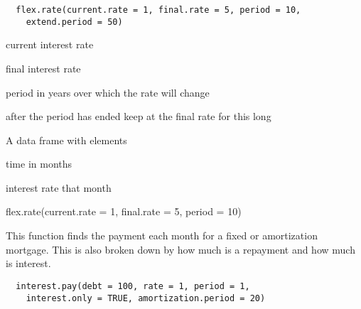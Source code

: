 \documentclass[a4paper]{book}
\begin{document}
%
\begin{Usage}
\begin{verbatim}
  flex.rate(current.rate = 1, final.rate = 5, period = 10,
    extend.period = 50)
\end{verbatim}
\end{Usage}
%
\begin{Arguments}
\begin{ldescription}
\item[\code{current.rate}] current interest rate

\item[\code{final.rate}] final interest rate

\item[\code{period}] period in years over which the rate will
change

\item[\code{extend.period}] after the period has ended keep at
the final rate for this long
\end{ldescription}
\end{Arguments}
%
\begin{Value}
A data frame with elements \begin{ldescription}
\item[\code{month}] time in months
\item[\code{rate}] interest rate that month
\end{ldescription}
\end{Value}
%
\begin{Examples}
\begin{ExampleCode}
flex.rate(current.rate = 1, final.rate = 5, period = 10)
\end{ExampleCode}
\end{Examples}
%
\begin{Description}\relax
This function finds the payment each month for a fixed or
amortization mortgage. This is also broken down by how
much is a repayment and how much is interest.
\end{Description}
%
\begin{Usage}
\begin{verbatim}
  interest.pay(debt = 100, rate = 1, period = 1,
    interest.only = TRUE, amortization.period = 20)
\end{verbatim}
\end{Usage}
%
\end{document}
